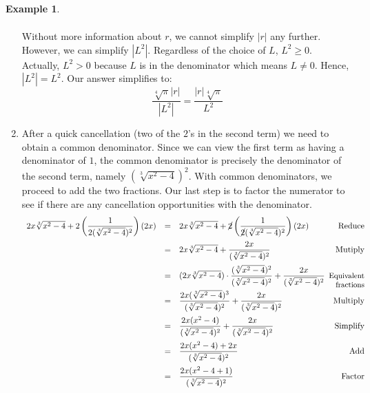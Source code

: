 \documentclass[11pt]{article}
\theoremstyle{definition}  %
\newtheorem{ex}{\bf Example}
\begin{document}
\begin{ex}
\begin{enumerate}
\[\begin{array}{rclr}
\end{array}\]  Without more information about $r$, we cannot simplify $|r|$ any further.  However, we can simplify $|L^2|$.  Regardless of the choice of $L$, $L^2 \geq 0$. Actually, $L^2 > 0$ because $L$ is in the denominator which means $L \neq 0$. Hence, $|L^2| = L^2$.  Our answer simplifies to: \[ \dfrac{\sqrt[4]{\pi}|r|}{|L^2|} = \dfrac{|r|\sqrt[4]{\pi}}{L^2} \]

\item After a quick cancellation (two of the $2$'s in the second term) we need to obtain a common denominator.  Since we can view the first term as having a denominator of $1$,  the common denominator is precisely the denominator of the second term, namely $(\sqrt[3]{x^2-4})^2$.  With common denominators, we proceed to add the two fractions.  Our last step is to factor the numerator to see if there are any cancellation opportunities with the denominator.\[ \begin{array}{rclr}

2x \sqrt[3]{x^2-4} + 2\left(\dfrac{1}{2(\sqrt[3]{x^2-4})^2}\right)  (2x) & = & 2x \sqrt[3]{x^2-4} + \cancel{2}\left(\dfrac{1}{\cancel{2}(\sqrt[3]{x^2-4})^2}\right)  (2x) & \text{Reduce}\\ [12pt]

& = & 2x \sqrt[3]{x^2-4} + \dfrac{2x}{(\sqrt[3]{x^2-4})^2} & \text{Mutiply} \\[12pt]

& = & (2x \sqrt[3]{x^2-4}) \cdot \dfrac{(\sqrt[3]{x^2-4})^2}{(\sqrt[3]{x^2-4})^2} + \dfrac{2x}{(\sqrt[3]{x^2-4})^2} & \hspace*{-.1in}\text{\small Equivalent} \\ [-8pt]
&   &                                                                                                               & \text{\small fractions} \\

& = & \dfrac{2x(\sqrt[3]{x^2-4})^3}{(\sqrt[3]{x^2-4})^2} + \dfrac{2x}{(\sqrt[3]{x^2-4})^2} & \text{Multiply}\\[12pt]

& = & \dfrac{2x(x^2-4)}{(\sqrt[3]{x^2-4})^2} + \dfrac{2x}{(\sqrt[3]{x^2-4})^2} & \text{Simplify}\\ [12pt]

& = & \dfrac{2x(x^2-4) + 2x}{(\sqrt[3]{x^2-4})^2} & \text{Add} \\ [12pt]


& = & \dfrac{2x(x^2-4 +1)}{(\sqrt[3]{x^2-4})^2} & \text{Factor}\\ [12pt]



\end{array}\]
\end{enumerate}
\end{ex}
\end{document}
